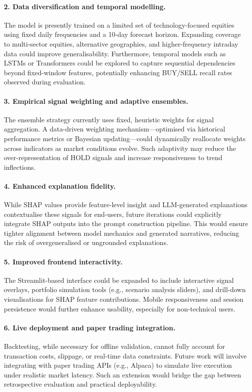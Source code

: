 \paragraph{2. Data diversification and temporal modelling.}
The model is presently trained on a limited set of technology-focused equities using fixed daily frequencies and a 10-day forecast horizon. Expanding coverage to multi-sector equities, alternative geographies, and higher-frequency intraday data could improve generalisability. Furthermore, temporal models such as LSTMs or Transformers could be explored to capture sequential dependencies beyond fixed-window features, potentially enhancing BUY/SELL recall rates observed during evaluation.

\paragraph{3. Empirical signal weighting and adaptive ensembles.}
The ensemble strategy currently uses fixed, heuristic weights for signal aggregation. A data-driven weighting mechanism—optimised via historical performance metrics or Bayesian updating—could dynamically reallocate weights across indicators as market conditions evolve. Such adaptivity may reduce the over-representation of HOLD signals and increase responsiveness to trend inflections.

\paragraph{4. Enhanced explanation fidelity.}
While SHAP values provide feature-level insight and LLM-generated explanations contextualise these signals for end-users, future iterations could explicitly integrate SHAP outputs into the prompt construction pipeline. This would ensure tighter alignment between model mechanics and generated narratives, reducing the risk of overgeneralised or ungrounded explanations.

\paragraph{5. Improved frontend interactivity.}
The Streamlit-based interface could be expanded to include interactive signal overlays, portfolio simulation tools (e.g., scenario analysis sliders), and drill-down visualisations for SHAP feature contributions. Mobile responsiveness and session persistence would further enhance usability, especially for non-technical users.

\paragraph{6. Live deployment and paper trading integration.}
Backtesting, while necessary for offline validation, cannot fully account for transaction costs, slippage, or real-time data constraints. Future work will involve integrating with paper trading APIs (e.g., Alpaca) to simulate live execution under realistic market latency. Such an extension would bridge the gap between retrospective evaluation and practical deployability.

